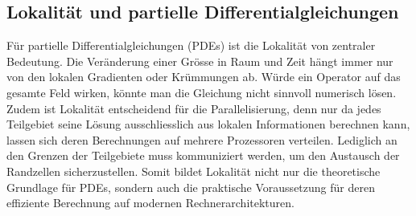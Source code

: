 \subsection{Lokalität und partielle Differentialgleichungen
\label{parallelisierung:sub:LokalitaetPDE}}
Für partielle Differentialgleichungen (PDEs) ist die Lokalität von zentraler Bedeutung. 
Die Veränderung einer Grösse in Raum und Zeit hängt immer nur von den lokalen Gradienten oder Krümmungen ab. 
Würde ein Operator auf das gesamte Feld wirken, könnte man die Gleichung nicht sinnvoll numerisch lösen. 
Zudem ist Lokalität entscheidend für die Parallelisierung, denn nur da jedes Teilgebiet seine Lösung ausschliesslich aus lokalen Informationen berechnen kann, lassen sich deren Berechnungen auf mehrere Prozessoren verteilen. 
Lediglich an den Grenzen der Teilgebiete muss kommuniziert werden, um den Austausch der Randzellen sicherzustellen. 
Somit bildet Lokalität nicht nur die theoretische Grundlage für PDEs, sondern auch die praktische Voraussetzung für deren effiziente Berechnung auf modernen Rechnerarchitekturen.

